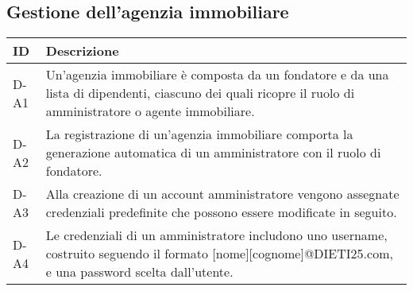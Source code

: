 \subsection*{Gestione dell'agenzia immobiliare}

\begin{table}[H]
    \centering
    \renewcommand{\arraystretch}{1.3} %
    
    \begin{tabular}{|p{3cm}|p{10cm}|} 
        \hline
        \textbf{ID} & \textbf{Descrizione} \\  
        \hline
        D-A1 &  Un’agenzia immobiliare è composta da un fondatore e da una lista di dipendenti, ciascuno
        dei quali ricopre il ruolo di amministratore o agente immobiliare. \\ 
        \hline
        D-A2 &  La registrazione di un’agenzia immobiliare comporta la generazione automatica di un
        amministratore con il ruolo di fondatore. \\ 
        \hline
        D-A3 &  Alla creazione di un account amministratore vengono assegnate credenziali predefinite
        che possono essere modificate in seguito. \\ 
        \hline
        D-A4 &   Le credenziali di un amministratore includono uno username, costruito seguendo il formato [nome][cognome]@DIETI25.com, e una password scelta dall’utente. \\ 
        \hline
    \end{tabular}
    
\end{table}